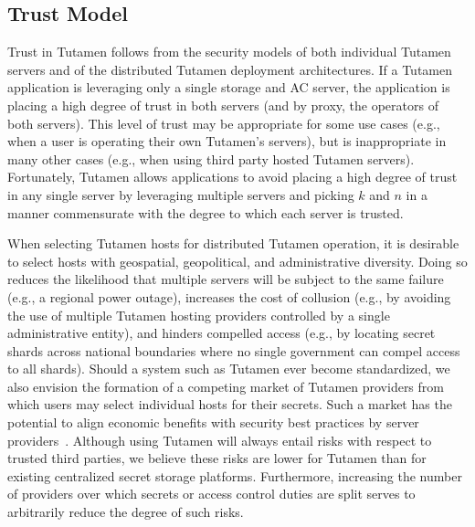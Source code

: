 \subsection{Trust Model}

Trust in Tutamen follows from the security models of both individual
Tutamen servers and of the distributed Tutamen deployment
architectures. If a Tutamen application is leveraging only a single
storage and AC server, the application is placing a high degree of
trust in both servers (and by proxy, the operators of both
servers). This level of trust may be appropriate for some use cases
(e.g., when a user is operating their own Tutamen's servers), but is
inappropriate in many other cases (e.g., when using third party hosted
Tutamen servers). Fortunately, Tutamen allows applications to avoid
placing a high degree of trust in any single server by leveraging
multiple servers and picking $k$ and $n$ in a manner commensurate with
the degree to which each server is trusted.

When selecting Tutamen hosts for distributed Tutamen operation, it is
desirable to select hosts with geospatial, geopolitical, and
administrative diversity. Doing so reduces the likelihood that
multiple servers will be subject to the same failure (e.g., a regional
power outage), increases the cost of collusion (e.g., by avoiding the
use of multiple Tutamen hosting providers controlled by a single
administrative entity), and hinders compelled access (e.g., by
locating secret shards across national boundaries where no single
government can compel access to all shards). Should a system such as
Tutamen ever become standardized, we also envision the formation of a
competing market of Tutamen providers from which users may select
individual hosts for their secrets. Such a market has the potential to
align economic benefits with security best practices by server
providers~\cite{sayler-phd}. Although using Tutamen will always entail
risks with respect to trusted third parties, we believe these risks
are lower for Tutamen than for existing centralized secret storage
platforms. Furthermore, increasing the number of providers over which
secrets or access control duties are split serves to arbitrarily
reduce the degree of such risks.

